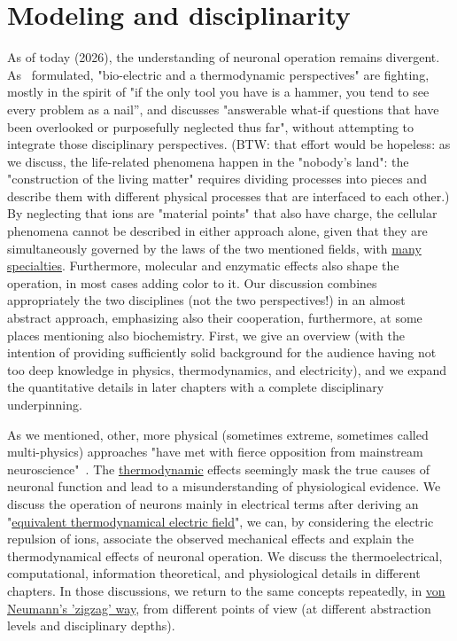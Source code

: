 \section[Modeling and disciplinarity]{Modeling and disciplinarity\label{sec:SINGLE_MultiPhysicsNeuronN}}


As of today (2026), the understanding of neuronal operation remains divergent. As~\cite{PerspectivesNerveSignalPropagation:2024} formulated,
"bio-electric and a thermodynamic perspectives" are fighting,
mostly in the spirit of "if the only tool you have is a hammer, you tend to see every problem as a nail”,
and discusses "answerable what-if questions that have been overlooked or purposefully neglected thus far", without attempting to integrate those
disciplinary perspectives. (BTW: that effort would be hopeless: 
as we discuss, the life-related phenomena happen in the "nobody's land":
the "construction of the living matter" requires dividing processes 
into pieces and describe them with different physical processes that
are interfaced to each other.) 
 By neglecting that ions are "material
points" that also have charge, the cellular phenomena cannot be described in either approach alone, given that they are simultaneously governed by the laws of 
the two mentioned fields, with \hyperlink{ThermodynamicsSpecialties}{many specialties}. Furthermore, molecular and enzymatic effects also shape the operation, in most cases adding color to it. Our discussion
combines appropriately the two disciplines (not the two perspectives!) in an almost abstract approach, emphasizing also their cooperation, furthermore, at some places mentioning also biochemistry.
First, we give an overview (with the intention of providing
sufficiently solid background for the audience having not too deep knowledge in physics, thermodynamics, and electricity), and we expand the
quantitative details in later chapters with a complete disciplinary underpinning.

As we mentioned, other, more physical (sometimes extreme, sometimes called multi-physics) approaches "have met with fierce opposition from mainstream neuroscience"~\cite{NerveSignalAsWindow:2023}. The
\hyperlink{Thermodynamics}{thermodynamic} effects seemingly mask the true causes of neuronal function and lead to a misunderstanding of physiological evidence.
We discuss the operation of neurons mainly in electrical terms after deriving an "\hyperlink{ThermodynamicElectricField}{equivalent thermodynamical electric field}", we can,
by considering the electric repulsion of ions, associate the observed mechanical effects and explain the thermodynamical effects of neuronal operation.
We discuss the thermoelectrical, computational, information theoretical, and physiological details in
different chapters. In those discussions, we return to the same concepts repeatedly, in \hyperlink{zigzagdiscussion}{von Neumann's 'zigzag' way}, from different points of view (at different abstraction levels and disciplinary depths).


